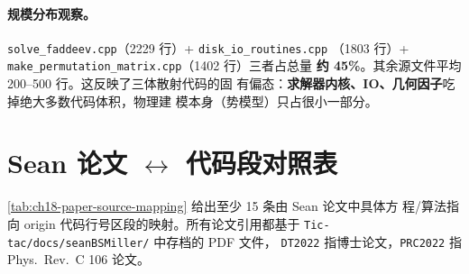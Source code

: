 \paragraph{规模分布观察。}
\texttt{solve\_faddeev.cpp}（2229 行）+ \texttt{disk\_io\_routines.cpp}
（1803 行）+ \texttt{make\_permutation\_matrix.cpp}（1402 行）三者占总量
\textbf{约 45\%}。其余源文件平均 200--500 行。这反映了三体散射代码的固
有偏态：\textbf{求解器内核、IO、几何因子}吃掉绝大多数代码体积，物理建
模本身（势模型）只占很小一部分。

\section{Sean 论文 $\leftrightarrow$ 代码段对照表}
\label{sec:ch18-paper-source}

\cref{tab:ch18-paper-source-mapping} 给出至少 15 条由 Sean 论文中具体方
程/算法指向 origin 代码行号区段的映射。所有论文引用都基于
\texttt{Tic-tac/docs/seanBSMiller/} 中存档的 PDF 文件，
\texttt{DT2022} 指博士论文，\texttt{PRC2022} 指 Phys.~Rev.~C 106 论文。

